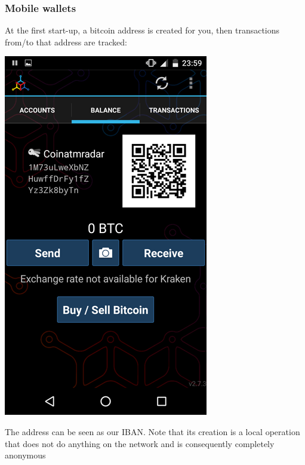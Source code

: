 \documentclass[11pt]{beamer}  %
\begin{document}
\begin{frame}\frametitle{Mobile wallets}

  At the first start-up, a bitcoin address is created for you, then transactions
  from/to that address are tracked:

  \begin{center}
    \includegraphics[scale=0.2,clip=false]{pictures/bitcoin-wallet.png}
  \end{center}

  The \alert{address} can be seen as our IBAN. Note that its creation
  is a local operation that does not do anything on the network and is consequently
  completely anonymous

\end{frame}
\end{document}
